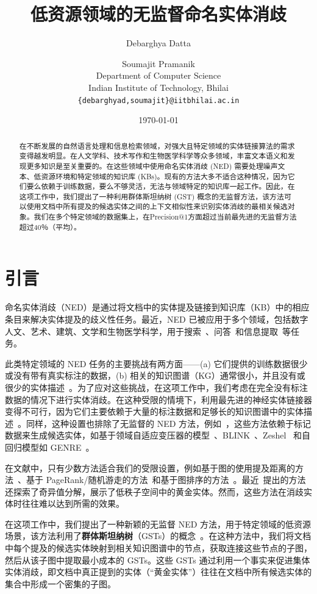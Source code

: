 \documentclass[11pt]{article}
\date{\today}
\author{
Debarghya Datta \and Soumajit Pramanik \\
Department of Computer Science\\
Indian Institute of Technology, Bhilai\\
\texttt{\{debarghyad,soumajit\}@iitbhilai.ac.in}\\
}
\title{低资源领域的无监督命名实体消歧}
\begin{document}
\maketitle
\begin{abstract}
在不断发展的自然语言处理和信息检索领域，对强大且特定领域的实体链接算法的需求变得越发明显。在人文学科、技术写作和生物医学科学等众多领域，丰富文本语义和发现更多知识是至关重要的。在这些领域中使用命名实体消歧 (NED) 需要处理噪声文本、低资源环境和特定领域的知识库 (KBs)。现有的方法大多不适合这种情况，因为它们要么依赖于训练数据，要么不够灵活，无法与领域特定的知识库一起工作。因此，在这项工作中，我们提出了一种利用群体斯坦纳树 (GST) 概念的无监督方法，该方法可以使用文档中所有提及的候选实体之间的上下文相似性来识别实体消歧的最相关候选对象。我们在多个特定领域的数据集上，在Precision@1方面超过当前最先进的无监督方法超过40％（平均）。

\end{abstract}
\section{引言}
命名实体消歧（NED）是通过将文档中的实体提及链接到知识库（KB）中的相应条目来解决实体提及的歧义性任务。最近，NED 已被应用于多个领域，包括数字人文、艺术、建筑、文学和生物医学科学，用于搜索~\cite{meij2014entity}、问答~\cite{yih-etal-2015-semantic}和信息提取~\cite{nooralahzadeh-ovrelid-2018-sirius}等任务。

此类特定领域的 NED 任务的主要挑战有两方面——(a) 它们提供的训练数据很少或没有带有真实标注的数据，(b) 相关的知识图谱（KG）通常很小，并且没有或很少的实体描述~\cite{shi2023knowledge}。为了应对这些挑战，在这项工作中，我们考虑在完全没有标注数据的情况下进行实体消歧。在这种受限的情境下，利用最先进的神经实体链接器变得不可行，因为它们主要依赖于大量的标注数据和足够长的知识图谱中的实体描述~\cite{CadavidSnchez2023EvaluatingEE, arora2021low}。同样，这种设置也排除了无监督的 NED 方法，例如~\cite{pan2015unsupervised}，这些方法依赖于标记数据来生成候选实体，如基于领域自适应变压器的模型~\cite{aydin-etal-2022-find}、BLINK~\cite{wu2019zero}、Zeshel~\cite{logeswaran-etal-2019-zero} 和自回归模型如 GENRE~\cite{decao2021autoregressive}。

在文献中，只有少数方法适合我们的受限设置，例如基于图的使用提及距离的方法~\cite{hoffart2011robust}、基于 PageRank/随机游走的方法~\cite{guo2018robust}和基于图排序的方法~\cite{alhelbawy2014graph}。最近~\cite{arora2021low}提出的方法还探索了奇异值分解，展示了低秩子空间中的黄金实体。然而，这些方法在消歧实体时往往难以达到所需的效果。

在这项工作中，我们提出了一种新颖的无监督 NED 方法，用于特定领域的低资源场景，该方法利用了\textbf{群体斯坦纳树}（GSTs）的概念~\cite{garg2000polylogarithmic}。在这种方法中，我们将文档中每个提及的候选实体映射到相关知识图谱中的节点，获取连接这些节点的子图，然后从该子图中提取最小成本的 GSTs。这些 GSTs 通过利用一个事实来促进集体实体消歧，即文档中真正提到的实体（“黄金实体”）往往在文档中所有候选实体的集合中形成一个密集的子图。
\end{document}
